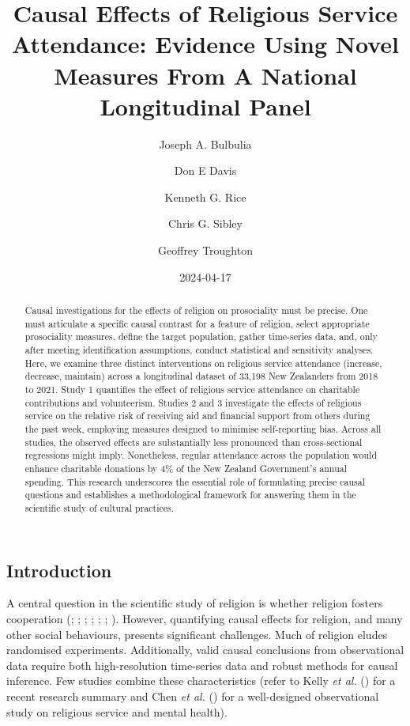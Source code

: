 \documentclass[
  single column]{article}
\title{Causal Effects of Religious Service Attendance: Evidence Using
Novel Measures From A National Longitudinal Panel}
\author{Joseph A. Bulbulia \and Don E Davis \and Kenneth G.
Rice \and Chris G. Sibley \and Geoffrey Troughton}
\date{2024-04-17}
\begin{document}
\maketitle
\begin{abstract}
Causal investigations for the effects of religion on prosociality must
be precise. One must articulate a specific causal contrast for a feature
of religion, select appropriate prosociality measures, define the target
population, gather time-series data, and, only after meeting
identification assumptions, conduct statistical and sensitivity
analyses. Here, we examine three distinct interventions on religious
service attendance (increase, decrease, maintain) across a longitudinal
dataset of 33,198 New Zealanders from 2018 to 2021. Study 1 quantifies
the effect of religious service attendance on charitable contributions
and volunteerism. Studies 2 and 3 investigate the effects of religious
service on the relative risk of receiving aid and financial support from
others during the past week, employing measures designed to minimise
self-reporting bias. Across all studies, the observed effects are
substantially less pronounced than cross-sectional regressions might
imply. Nonetheless, regular attendance across the population would
enhance charitable donations by 4\% of the New Zealand Government's
annual spending. This research underscores the essential role of
formulating precise causal questions and establishes a methodological
framework for answering them in the scientific study of cultural
practices.
\end{abstract}

\subsection{Introduction}\label{introduction}

A central question in the scientific study of religion is whether
religion fosters cooperation (; ;
;
;
;
;
). However,
quantifying causal effects for religion, and many other social
behaviours, presents significant challenges. Much of religion eludes
randomised experiments. Additionally, valid causal conclusions from
observational data require both high-resolution time-series data and
robust methods for causal inference. Few studies combine these
characteristics (refer to Kelly \emph{et al.}
() for a recent research
summary and Chen \emph{et al.} ()
for a well-designed observational study on religious service and mental
health).
\end{document}
